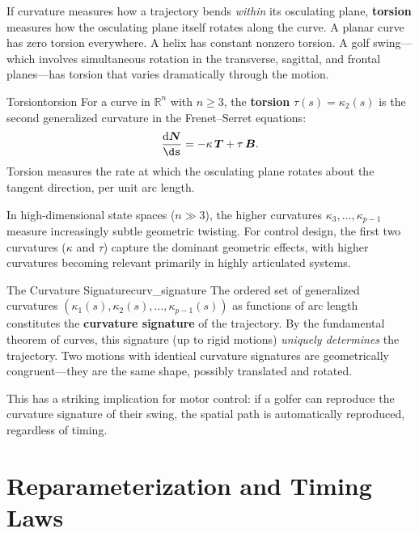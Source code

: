 \documentclass[12pt, openany]{book}
\theoremstyle{plain}
\newcommand{\Reals}{\mathbb{R}}
\newcommand{\dd}{\mathrm{d}}
\newcommand{\tangent}{\bm{T}}
\newcommand{\normal}{\bm{N}}
\newcommand{\binormal}{\bm{B}}
\begin{document}
If curvature measures how a trajectory bends \emph{within} its osculating
plane, \textbf{torsion} measures how the osculating plane itself rotates along
the curve. A planar curve has zero torsion everywhere. A helix has constant
nonzero torsion. A golf swing---which involves simultaneous rotation in the
transverse, sagittal, and frontal planes---has torsion that varies dramatically
through the motion.

\begin{definition}{Torsion}{torsion}
  For a curve in $\Reals^n$ with $n \geq 3$, the \textbf{torsion}
  $\tau(s) = \kappa_2(s)$ is the second generalized curvature in the
  Frenet--Serret equations:
  \begin{equation}
    \frac{\dd\normal}{\ds} = -\kappa\, \tangent + \tau\, \binormal.
  \end{equation}
  Torsion measures the rate at which the osculating plane rotates about the
  tangent direction, per unit arc length.
\end{definition}

In high-dimensional state spaces ($n \gg 3$), the higher curvatures
$\kappa_3, \ldots, \kappa_{p-1}$ measure increasingly subtle geometric
twisting. For control design, the first two curvatures ($\kappa$ and $\tau$)
capture the dominant geometric effects, with higher curvatures becoming
relevant primarily in highly articulated systems.

\begin{remark}{The Curvature Signature}{curv_signature}
  The ordered set of generalized curvatures $(\kappa_1(s), \kappa_2(s),
  \ldots, \kappa_{p-1}(s))$ as functions of arc length constitutes the
  \textbf{curvature signature} of the trajectory. By the fundamental theorem
  of curves, this signature (up to rigid motions) \emph{uniquely determines}
  the trajectory. Two motions with identical curvature signatures are
  geometrically congruent---they are the same shape, possibly translated
  and rotated.

  This has a striking implication for motor control: if a golfer can reproduce
  the curvature signature of their swing, the spatial path is automatically
  reproduced, regardless of timing.
\end{remark}

\section{Reparameterization and Timing Laws}
\end{document}
